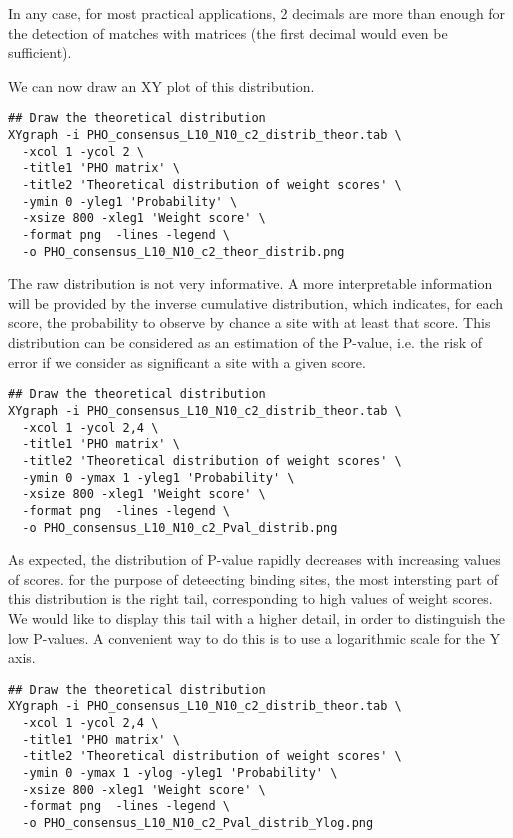 In any case, for most practical applications, 2 decimals are more than
enough for the detection of matches with matrices (the first decimal
would even be sufficient).

We can now draw an XY plot of this distribution. 

{\color{Blue} \begin{footnotesize} 
\begin{verbatim}
## Draw the theoretical distribution
XYgraph -i PHO_consensus_L10_N10_c2_distrib_theor.tab \
  -xcol 1 -ycol 2 \
  -title1 'PHO matrix' \
  -title2 'Theoretical distribution of weight scores' \
  -ymin 0 -yleg1 'Probability' \
  -xsize 800 -xleg1 'Weight score' \
  -format png  -lines -legend \
  -o PHO_consensus_L10_N10_c2_theor_distrib.png
\end{verbatim} \end{footnotesize}
}


The raw distribution is not very informative. A more interpretable
information will be provided by the inverse cumulative distribution,
which indicates, for each score, the probability to observe by chance
a site with at least that score. This distribution can be considered
as an estimation of the P-value, i.e. the risk of error if we consider
as significant a site with a given score.

{\color{Blue} \begin{footnotesize} 
\begin{verbatim}
## Draw the theoretical distribution
XYgraph -i PHO_consensus_L10_N10_c2_distrib_theor.tab \
  -xcol 1 -ycol 2,4 \
  -title1 'PHO matrix' \
  -title2 'Theoretical distribution of weight scores' \
  -ymin 0 -ymax 1 -yleg1 'Probability' \
  -xsize 800 -xleg1 'Weight score' \
  -format png  -lines -legend \
  -o PHO_consensus_L10_N10_c2_Pval_distrib.png
\end{verbatim} \end{footnotesize}
}

As expected, the distribution of P-value rapidly decreases with
increasing values of scores. for the purpose of deteecting binding
sites, the most intersting part of this distribution is the right
tail, corresponding to high values of weight scores. We would like to
display this tail with a higher detail, in order to distinguish the
low P-values. A convenient way to do this is to use a logarithmic
scale for the Y axis.

{\color{Blue} \begin{footnotesize} 
\begin{verbatim}
## Draw the theoretical distribution
XYgraph -i PHO_consensus_L10_N10_c2_distrib_theor.tab \
  -xcol 1 -ycol 2,4 \
  -title1 'PHO matrix' \
  -title2 'Theoretical distribution of weight scores' \
  -ymin 0 -ymax 1 -ylog -yleg1 'Probability' \
  -xsize 800 -xleg1 'Weight score' \
  -format png  -lines -legend \
  -o PHO_consensus_L10_N10_c2_Pval_distrib_Ylog.png
\end{verbatim} \end{footnotesize}
}


